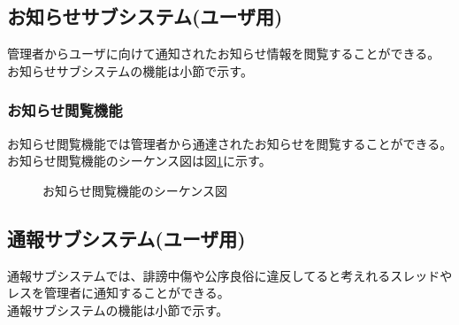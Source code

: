 \documentclass[a4j]{jarticle}
\begin{document}
  \subsection{お知らせサブシステム(ユーザ用)}
  管理者からユーザに向けて通知されたお知らせ情報を閲覧することができる。\\
  お知らせサブシステムの機能は小節で示す。
  \subsubsection{お知らせ閲覧機能}
  お知らせ閲覧機能では管理者から通達されたお知らせを閲覧することができる。
  お知らせ閲覧機能のシーケンス図は図\ref{fig:news_reading.png}に示す。

  \begin{figure}[H]
    \centering
    \caption{お知らせ閲覧機能のシーケンス図}
    \label{fig:news_reading.png}
  \end{figure}
  \subsection{通報サブシステム(ユーザ用)}
  通報サブシステムでは、誹謗中傷や公序良俗に違反してると考えれるスレッドやレスを管理者に通知することができる。\\
  通報サブシステムの機能は小節で示す。
\end{document}
